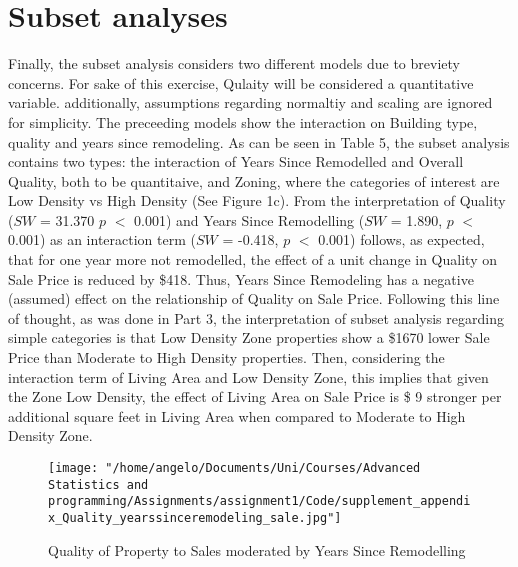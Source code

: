 \documentclass[a4paper]{article}
\begin{document}
\section{Subset analyses}
Finally, the subset analysis considers two different models due to breviety concerns. For sake of this exercise, Qulaity will be considered a quantitative variable. additionally, assumptions regarding normaltiy and scaling are ignored for simplicity. The preceeding models show the interaction on Building type, quality and years since remodeling. 
As can be seen in Table 5, the subset analysis contains two types: the interaction of Years Since Remodelled and Overall Quality, both to be quantitaive, and Zoning, where the categories of interest are Low Density vs High Density (See Figure 1c). 
From the interpretation of Quality ($SW$ = 31.370  $p$ $<$ 0.001) and Years Since Remodelling ($SW$ = 1.890,  $p$ $<$ 0.001) as an interaction term ($SW$ = -0.418,  $p$ $<$ 0.001) follows, as expected, that for one year more not remodelled, the effect of a unit change in Quality on Sale Price is reduced by \$418. Thus, Years Since Remodeling has a negative (assumed) effect on the relationship of Quality on Sale Price. 
Following this line of thought, as was done in Part 3, the interpretation of subset analysis regarding simple categories is that  Low Density Zone properties show a \$1670 lower Sale Price than Moderate to High Density properties. Then, considering the interaction term of Living Area and Low Density Zone, this implies that given the Zone Low Density, the effect of Living Area on Sale Price is \$ 9 stronger per additional square feet in Living Area when compared to Moderate to High Density Zone.  






\begin{figure}

         \texttt{[image: "/home/angelo/Documents/Uni/Courses/Advanced Statistics and programming/Assignments/assignment1/Code/supplement\_appendix\_Quality\_yearssinceremodeling\_sale.jpg"]}
         \small
         \caption{Quality of Property to Sales moderated by Years Since Remodelling}
\end{figure}
\end{document}
